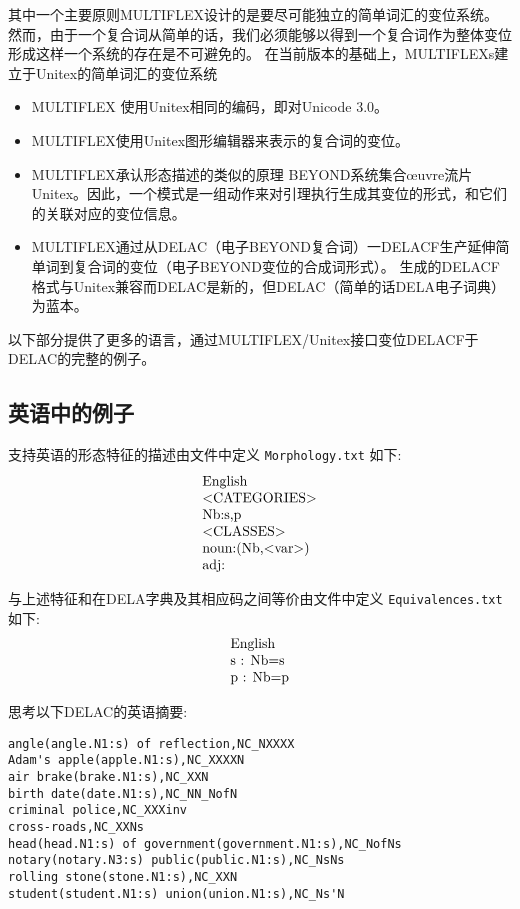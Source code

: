其中一个主要原则MULTIFLEX设计的是要尽可能独立的简单词汇的变位系统。
然而，由于一个复合词从简单的话，我们必须能够以得到一个复合词作为整体变位形成这样一个系统的存在是不可避免的。
\bigskip
\noindent 
在当前版本的基础上，MULTIFLEXs建立于Unitex的简单词汇的变位系统 
\begin{itemize}

\item MULTIFLEX 使用Unitex相同的编码，即对Unicode 3.0。
\item MULTIFLEX使用Unitex图形编辑器来表示的复合词的变位。
\item MULTIFLEX承认形态描述的类似的原理
BEYOND系统集合{\oe}uvre流片Unitex。因此，一个模式是一组动作来对引理执行生成其变位的形式，和它们的关联对应的变位信息。
\item MULTIFLEX通过从DELAC（电子BEYOND复合词）一DELACF生产延伸简单词到复合词的变位（电子BEYOND变位的合成词形式）。
生成的DELACF格式与Unitex兼容而DELAC是新的，但DELAC（简单的话DELA电子词典）为蓝本。
\end{itemize}

\bigskip
\noindent 
以下部分提供了更多的语言，通过MULTIFLEX/Unitex接口变位DELACF于DELAC的完整的例子。

\subsection{英语中的例子}
支持英语的形态特征的描述由文件中定义 \verb+Morphology.txt+ 如下:
\[
\begin{array}[l]{l}
$English$ \\
$<CATEGORIES>$ \\
$Nb:s,p$ \\
$<CLASSES>$ \\
$noun:(Nb,<var>)$ \\
$adj:$
\end{array}
\]

\bigskip
\noindent 与上述特征和在DELA字典及其相应码之间等价由文件中定义 \verb+Equivalences.txt+ 如下: 
\[
\begin{array}[l]{l}
$English$ \\
$s : Nb=s$ \\
$p : Nb=p$ \\
\end{array}
\]

\bigskip
\noindent 思考以下DELAC的英语摘要:

\begin{verbatim}
angle(angle.N1:s) of reflection,NC_NXXXX
Adam's apple(apple.N1:s),NC_XXXXN
air brake(brake.N1:s),NC_XXN
birth date(date.N1:s),NC_NN_NofN
criminal police,NC_XXXinv
cross-roads,NC_XXNs
head(head.N1:s) of government(government.N1:s),NC_NofNs
notary(notary.N3:s) public(public.N1:s),NC_NsNs
rolling stone(stone.N1:s),NC_XXN
student(student.N1:s) union(union.N1:s),NC_Ns'N
\end{verbatim}

